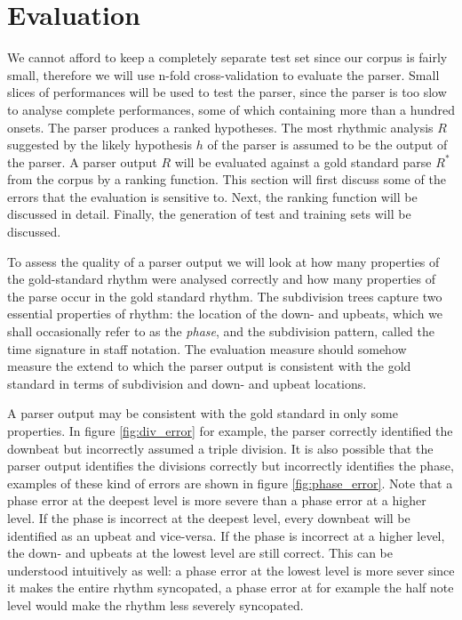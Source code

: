 \chapter{Evaluation}
\label{sec:evaluation}




We cannot afford to keep a completely separate test set since our corpus is fairly small, therefore we will use n-fold cross-validation to evaluate the parser. Small slices of performances will be used to test the parser, since the parser is too slow to analyse complete performances, some of which containing more than a hundred onsets.  The parser produces a ranked hypotheses. The most rhythmic analysis $R$ suggested by the likely hypothesis $h$ of the parser is assumed to be the output of the parser. A parser output $R$ will be evaluated against a gold standard parse $R^*$ from the corpus by a ranking function. This section will first discuss some of the errors that the evaluation is sensitive to. Next, the ranking function will be discussed in detail. Finally, the generation of test and training sets will be discussed.

To assess the quality of a parser output we will look at how many properties of the gold-standard rhythm were analysed correctly and how many properties of the parse occur in the gold standard rhythm. The subdivision trees capture two essential properties of rhythm: the location of the down- and upbeats, which we shall occasionally refer to as the \textit{phase}, and the subdivision pattern, called the time signature in staff notation. The evaluation measure should somehow measure the extend to which the parser output is consistent with the gold standard in terms of subdivision and down- and upbeat locations. 

A parser output may be consistent with the gold standard in only some properties. In figure \ref{fig:div_error} for example, the parser correctly identified the downbeat but incorrectly assumed a triple division. It is also possible that the parser output identifies the divisions correctly but incorrectly identifies the phase, examples of these kind of errors are shown in figure \ref{fig:phase_error}. Note that a phase error at the deepest level is more severe than a phase error at a higher level. If the phase is incorrect at the deepest level, every downbeat will be identified as an upbeat and vice-versa. If the phase is incorrect at a higher level, the down- and upbeats at the lowest level are still correct. This can be understood intuitively as well: a phase error at the lowest level is more sever since it makes the entire rhythm syncopated, a phase error at for example the half note level would make the rhythm less severely syncopated.

